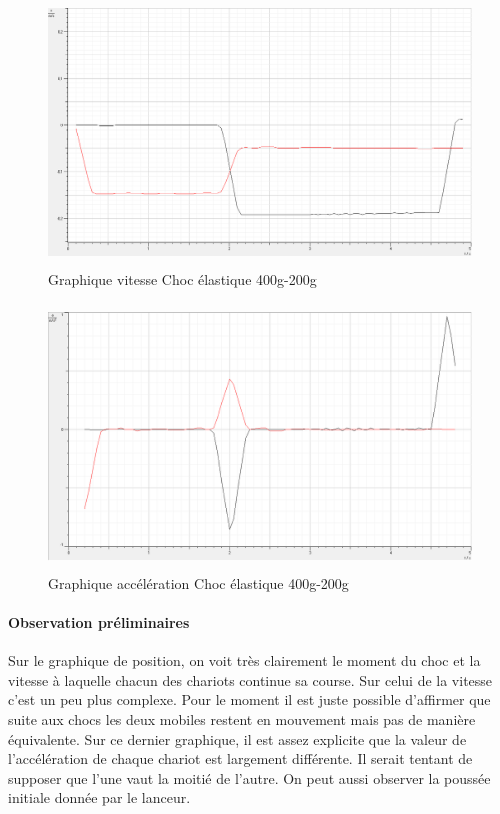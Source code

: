\begin{figure}[h]
    \caption[Graphique vitesse Choc élastique 400g-200g]{Graphique vitesse Choc élastique 400g-200g}
    \centering
    \includegraphics[height=19em]{Data/400-200ela02v.png}
\end{figure}

\newpage

\begin{figure}[h]
    \caption[Graphique accélération Choc élastique 400g-200g]{Graphique accélération Choc élastique 400g-200g}
    \centering
    \includegraphics[height=19em]{Data/400-200ela02a.png}
\end{figure}

\paragraph{Observation préliminaires}
Sur le graphique de position, on voit très clairement le moment du choc et la vitesse à laquelle chacun des chariots continue sa course.
Sur celui de la vitesse c'est un peu plus complexe. Pour le moment il est juste possible d'affirmer que suite aux chocs les deux mobiles restent en mouvement mais pas de manière équivalente.
Sur ce dernier graphique, il est assez explicite que la valeur de l'accélération de chaque chariot est largement différente. Il serait tentant de supposer que l'une vaut la moitié de l'autre. On peut aussi observer la poussée initiale donnée par le lanceur.

